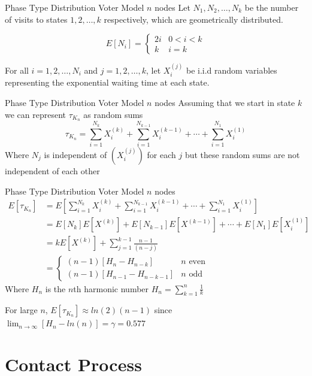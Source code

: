 \documentclass{beamer}
\theoremstyle{definition}
\begin{document}
\begin{frame}{Phase Type Distribution Voter Model $n$ nodes}
   Let $N_1, N_2, \ldots, N_k$ be the number of visits to states $1, 2, \ldots, k$ respectively, which are geometrically distributed.
   
$$
E[N_i] = \begin{cases}
    2i & 0 < i < k\\
    k & i = k
\end{cases}
$$   

For all $i = 1,2,\ldots, N_i$ and $j = 1,2,\ldots, k$, let $X_i^{(j)}$ be i.i.d random variables representing the exponential waiting time at each state.


\end{frame}

\begin{frame}{Phase Type Distribution Voter Model $n$ nodes}
Assuming that we start in state $k$ we can represent $\tau_{K_n}$ as random sums
$$
    \tau_{K_n} = \sum_{i = 1}^{N_k} X_i^{(k)} + \sum_{i = 1}^{N_{k - 1}} X_i^{(k - 1)} + \cdots + \sum_{i = 1}^{N_1} X_i^{(1)}
$$
Where $N_j$ is independent of $(X_i^{(j)})$ for each $j$ but these random sums are not independent of each other
\end{frame}

\begin{frame}{Phase Type Distribution Voter Model $n$ nodes}
    \begin{align*}
    E[\tau_{K_n}] &= E\left[\sum_{i = 1}^{N_k} X_i^{(k)} + \sum_{i = 1}^{N_{k - 1}} X_i^{(k - 1)} + \cdots + \sum_{i = 1}^{N_1} X_i^{(1)}\right]\\
    &= E[N_k] E[X^{(k)}] + E[N_{k - 1}] E[X^{(k - 1)}] + \cdots + E[N_1]E[X_i^{(1)}]\\
    &= k E[X^{(k)}] + \sum_{j = 1}^{k - 1} \frac{n - 1}{(n - j)}\\
    &= \begin{cases}
    (n - 1) \left[H_{n} - H_{n - k}\right] & n \text{ even}\\
    (n - 1) \left[H_{n - 1} - H_{n - k - 1}\right] & n \text{ odd}
    \end{cases}
    \end{align*}
Where $H_n$ is the $n$th harmonic number $H_n = \sum_{k = 1}^n \frac{1}{k}$

For large $n$, $E[\tau_{K_n}] \approx ln(2) (n - 1)$ since $\lim_{n \to \infty} [H_n - ln(n)] = \gamma = 0.577$
\end{frame}


\section{Contact Process}
\end{document}
